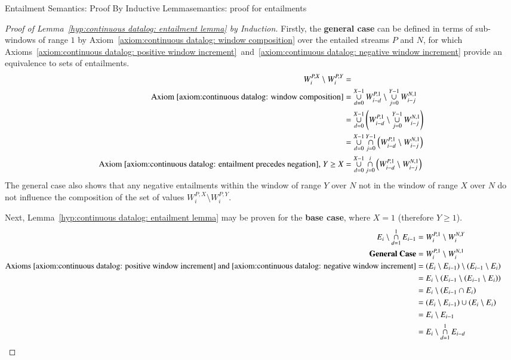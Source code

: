 \begin{nestedsection}{Entailment Semantics: Proof By Inductive Lemma}{semantics: proof for entailments}
\begin{proof}[Proof of Lemma~\ref{hyp:continuous datalog: entailment lemma} by Induction]
		Firstly, the \textbf{general case} can be defined in terms of sub-windows of range $1$ by Axiom~\ref{axiom:continuous datalog: window composition} over the entailed streams $P$ and $N$, for which Axioms~\ref{axiom:continuous datalog: positive window increment}~and~\ref{axiom:continuous datalog: negative window increment} provide an equivalence to sets of entailments.
		\begin{align*}
			W^{P,X}_{i} \setminus W^{P,Y}_{i} & = \\
			\text{Axiom~\ref{axiom:continuous datalog: window composition}} & = \mathop{\cup}^{X-1}_{d=0}W^{P,1}_{i-d} \setminus \mathop{\cup}^{Y-1}_{j=0}W^{N,1}_{i-j} \\
			& = \mathop{\cup}^{X-1}_{d=0} \left( W^{P,1}_{i-d} \setminus \mathop{\cup}^{Y-1}_{j=0}W^{N,1}_{i-j} \right) \\
			& = \mathop{\cup}^{X-1}_{d=0}\mathop{\cap}^{Y-1}_{j=0} \left( W^{P,1}_{i-d} \setminus W^{N,1}_{i-j} \right) \\
			\text{Axiom~\ref{axiom:continuous datalog: entailment precedes negation}, } Y \geq X & = \mathop{\cup}^{X-1}_{d=0}\mathop{\cap}^{i}_{j=0} \left( W^{P,1}_{i-d} \setminus W^{N,1}_{i-j} \right)
		\end{align*}
		The general case also shows that any negative entailments within the window of range $Y$ over $N$ not in the window of range $X$ over $N$ do not influence the composition of the set of values ${W^{P,X}_{i} \setminus W^{P,Y}_{i}}$.

		Next, Lemma~\ref{hyp:continuous datalog: entailment lemma} may be proven for the \textbf{base case}, where ${X = 1}$ (therefore ${Y \geq 1}$).
		\begin{align*}
			E_{i} \setminus \mathop{\cap}^{1}_{d=1} E_{i-1} & = W^{P,1}_{i} \setminus W^{N,Y}_{i} \\
			\text{\textbf{General Case}} & = W^{P,1}_{i} \setminus W^{N,1}_{i} \\
			\text{Axioms~\ref{axiom:continuous datalog: positive window increment}~and~\ref{axiom:continuous datalog: negative window increment}} & = \left( E_{i} \setminus E_{i-1} \right) \setminus \left( E_{i-1} \setminus E_{i} \right) \\
			& = E_{i} \setminus \left( E_{i-1} \setminus \left( E_{i-1} \setminus E_{i} \right) \right) \\
			& = E_{i} \setminus \left( E_{i-1} \cap E_{i} \right) \\
			& = \left( E_{i} \setminus E_{i-1} \right) \cup \left( E_{i} \setminus E_{i} \right) \\
			& = E_{i} \setminus E_{i-1} \\
			& = E_{i} \setminus \mathop{\cap}^{1}_{d=1} E_{i-d} && \qedhere
		\end{align*}


\end{proof}
\end{nestedsection}
